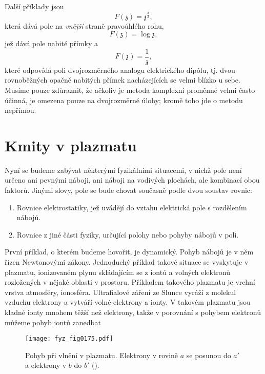   Další příklady jsou
  \begin{equation}\label{fyz:eq838}
    F(\mathfrak{z}) = \mathfrak{z}^\frac{3}{2},
  \end{equation}
  která dává pole na \emph{vnější} straně pravoúhlého rohu,
  \begin{equation}\label{fyz:eq839}
    F(\mathfrak{z}) = \log\mathfrak{z},
  \end{equation}
  jež dává pole nabité přímky a
  \begin{equation}\label{fyz:eq840}
    F(\mathfrak{z}) = \dfrac{1}{\mathfrak{z}},
  \end{equation}
  které odpovídá poli dvojrozměrného analogu elektrického dipólu, tj. dvou rovnoběžných opačně
  nabitých přímek nacházejících se velmi blízko u sebe. Musíme pouze zdůraznit, že ačkoliv je metoda
  komplexní proměnné velmi často účinná, je omezena pouze na dvojrozměrné úlohy; kromě toho jde o
  metodu nepřímou.
  
\section{Kmity v plazmatu}\label{fyz:IIchapVsecXXIV} 
  Nyní se budeme zabývat některými fyzikálními situacemi, v nichž pole není určeno ani pevnými
  náboji, ani náboji na vodivých plochách, ale kombinací obou faktorů. Jinými slovy, pole se bude
  chovat současně podle dvou soustav rovnic:
  \begin{enumerate}
    \item Rovnice elektrostatiky, jež uvádějí do vztahu elektrická pole s rozdělením nábojů.
    \item Rovnice z jiné části fyziky, určující polohy nebo pohyby nábojů v poli.
  \end{enumerate}

  První příklad, o kterém budeme hovořit, je dynamický. Pohyb nábojů je v něm řízen Newtonovými
  zákony. Jednoduchý příklad takové situace se vyskytuje v plazmatu, ionizovaném plynu skládajícím
  se z iontů a volných elektronů rozložených v nějaké oblasti v prostoru. Příkladem takového
  plazmatu je vrchní vrstva atmosféry, ionosféra. Ultrafialové záření ze Slunce vyráží z molekul
  vzduchu elektrony a vytváří volné elektrony a ionty. V takovém plazmatu jsou kladné ionty mnohem
  těžší než elektrony, takže v porovnání s pohybem elektronů můžeme pohyb iontů zanedbat
  
  \begin{figure}[ht!]  %
    \centering
    \texttt{[image: fyz\_fig0175.pdf]}
    \caption{Pohyb při vlnění v plazmatu. Elektrony v rovině \(a\) se posunou do \(a'\) a 
             elektrony v \(b\) do \(b'\)
             (\cite[s.~130]{Feynman02}).}
    \label{fyz:fig0175}
  \end{figure}


